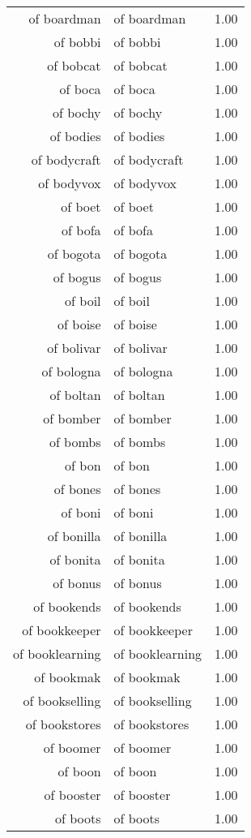 \begin{table}[ht]
\begin{tabular}{rlr}
  of boardman & of boardman & 1.00 \\ 
  of bobbi & of bobbi & 1.00 \\ 
  of bobcat & of bobcat & 1.00 \\ 
  of boca & of boca & 1.00 \\ 
  of bochy & of bochy & 1.00 \\ 
  of bodies & of bodies & 1.00 \\ 
  of bodycraft & of bodycraft & 1.00 \\ 
  of bodyvox & of bodyvox & 1.00 \\ 
  of boet & of boet & 1.00 \\ 
  of bofa & of bofa & 1.00 \\ 
  of bogota & of bogota & 1.00 \\ 
  of bogus & of bogus & 1.00 \\ 
  of boil & of boil & 1.00 \\ 
  of boise & of boise & 1.00 \\ 
  of bolivar & of bolivar & 1.00 \\ 
  of bologna & of bologna & 1.00 \\ 
  of boltan & of boltan & 1.00 \\ 
  of bomber & of bomber & 1.00 \\ 
  of bombs & of bombs & 1.00 \\ 
  of bon & of bon & 1.00 \\ 
  of bones & of bones & 1.00 \\ 
  of boni & of boni & 1.00 \\ 
  of bonilla & of bonilla & 1.00 \\ 
  of bonita & of bonita & 1.00 \\ 
  of bonus & of bonus & 1.00 \\ 
  of bookends & of bookends & 1.00 \\ 
  of bookkeeper & of bookkeeper & 1.00 \\ 
  of booklearning & of booklearning & 1.00 \\ 
  of bookmak & of bookmak & 1.00 \\ 
  of bookselling & of bookselling & 1.00 \\ 
  of bookstores & of bookstores & 1.00 \\ 
  of boomer & of boomer & 1.00 \\ 
  of boon & of boon & 1.00 \\ 
  of booster & of booster & 1.00 \\ 
  of boots & of boots & 1.00 \\ 

\end{tabular}
\end{table}
